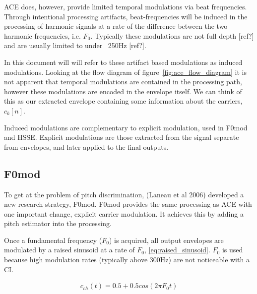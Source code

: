\documentclass [11pt, proquest,oneside] {uwthesis}[2015/03/03]
\begin{document}

ACE does, however, provide limited temporal modulations via beat frequencies.  Through intentional processing artifacts, beat-frequencies will be induced in the processing of harmonic signals at a rate of the difference between the two harmonic frequencies, i.e. $F_0$.  Typically these modulations are not full depth [ref?] and are usually limited to under ~250Hz [ref?].

In this document will will refer to these artifact based modulations as induced modulations.  Looking at the flow diagram of figure~\ref{fig:ace_flow_diagram} it is not apparent that temporal modulations are contained in the processing path, however these modulations are encoded in the envelope itself.  We can think of this as our extracted envelope containing some information about the carriers, $c_k[n]$.

Induced modulations are complementary to explicit modulation, used in F0mod and HSSE.  Explicit modulations are those extracted from the signal separate from envelopes, and later applied to the final outputs.

\subsection{F0mod}

To get at the problem of pitch discrimination, (Laneau et al 2006) developed a new research strategy, F0mod.  F0mod provides the same processing as ACE with one important change, explicit carrier modulation.  It achieves this by adding a pitch estimator into the processing.

Once a fundamental frequency ($F_0$) is acquired, all output envelopes are modulated by a raised sinusoid at a rate of $F_0$, \ref{eq:raised_sinusoid}.  $F_0$ is used because high modulation rates (typically above 300Hz) are not noticeable with a CI.

\begin{align}
\label{eq:raised_sinusoid}
c_{ch}(t) = 0.5 + 0.5cos(2\pi F_0t)
\end{align}
\end{document}
